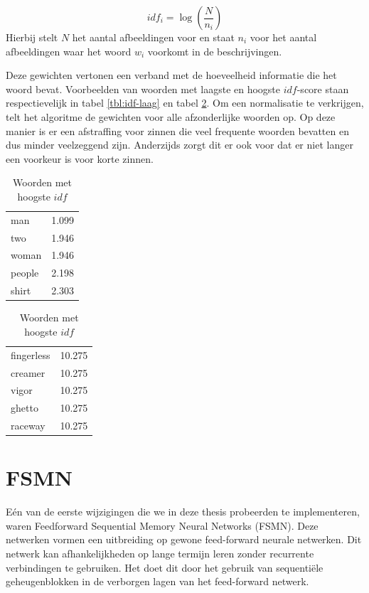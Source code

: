 \begin{equation}
    idf_i = \log(\frac{N}{n_i})
\end{equation}
Hierbij stelt $N$ het aantal afbeeldingen voor en staat $n_i$ voor het aantal afbeeldingen waar het woord $w_i$ voorkomt in de beschrijvingen.

Deze gewichten vertonen een verband met de hoeveelheid informatie die het woord bevat. Voorbeelden van woorden met laagste en hoogste $idf$-score staan respectievelijk in tabel \ref{tbl:idf-laag} en tabel \ref{tbl:idf-hoog}. Om een normalisatie te verkrijgen, telt het algoritme de gewichten voor alle afzonderlijke woorden op. Op deze manier is er een afstraffing voor zinnen die veel frequente woorden bevatten en dus minder veelzeggend zijn. Anderzijds zorgt dit er ook voor dat er niet langer een voorkeur is voor korte zinnen.


\begin{table}[!htb]
	\begin{minipage}{.5\linewidth}
		\centering
		\begin{tabular}{ll}
    man    & 1.099 \\
    two    & 1.946 \\
    woman  & 1.946 \\
    people & 2.198 \\
    shirt  & 2.303 \\
		\end{tabular}
		\caption{Woorden met laagste $idf$}
		\label{tbl:idf-laag}
	\end{minipage}%
	\begin{minipage}{.5\linewidth}
		\centering
		
		\begin{tabular}{ll}
	fingerless & 10.275\\
	creamer& 10.275\\
	vigor& 10.275\\
	ghetto& 10.275\\
	raceway& 10.275\\
		\end{tabular}
		\caption{Woorden met hoogste $idf$}
		\label{tbl:idf-hoog}
	\end{minipage} 
\end{table}


\section{FSMN}
E\'en van de eerste wijzigingen die we in deze thesis probeerden te implementeren, waren Feedforward Sequential Memory Neural Networks (FSMN)\cite{Zhang}. Deze netwerken vormen een uitbreiding op gewone feed-forward neurale netwerken. Dit netwerk kan afhankelijkheden op lange termijn leren zonder recurrente verbindingen te gebruiken. Het doet dit door het gebruik van sequenti\"ele geheugenblokken in de verborgen lagen van het feed-forward netwerk. 

